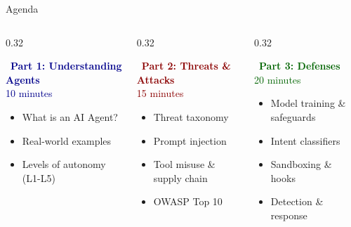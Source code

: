 \documentclass[aspectratio=169,9pt]{beamer}
\begin{document}
\begin{frame}{Agenda}
\begin{columns}[T]
\begin{column}{0.32\textwidth}
\begin{bluebox}
\textcolor{darkblue}{\faBook\ \textbf{Part 1: Understanding Agents}}\\
{\scriptsize\textcolor{darkblue}{10 minutes}}\\[0.5em]
\begin{itemize}\small
  \item What is an AI Agent?
  \item Real-world examples
  \item Levels of autonomy (L1-L5)
\end{itemize}
\end{bluebox}
\end{column}

\begin{column}{0.32\textwidth}
\begin{redbox}
\textcolor{darkred}{\faUnlock\ \textbf{Part 2: Threats \& Attacks}}\\
{\scriptsize\textcolor{darkred}{15 minutes}}\\[0.5em]
\begin{itemize}\small
  \item Threat taxonomy
  \item Prompt injection
  \item Tool misuse \& supply chain
  \item OWASP Top 10
\end{itemize}
\end{redbox}
\end{column}

\begin{column}{0.32\textwidth}
\begin{greenbox}
\textcolor{darkgreen}{\faShieldAlt\ \textbf{Part 3: Defenses}}\\
{\scriptsize\textcolor{darkgreen}{20 minutes}}\\[0.5em]
\begin{itemize}\small
  \item Model training \& safeguards
  \item Intent classifiers
  \item Sandboxing \& hooks
  \item Detection \& response
\end{itemize}
\end{greenbox}
\end{column}
\end{columns}


\end{frame}
\end{document}
